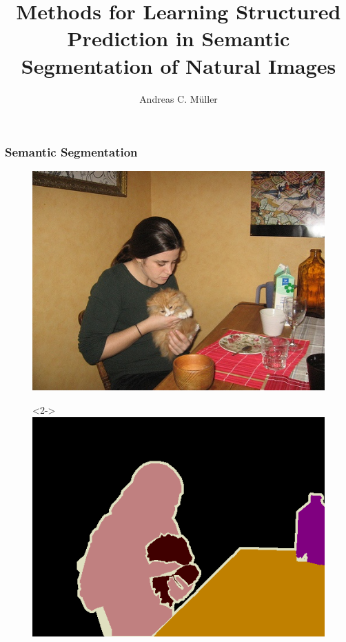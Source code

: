 \documentclass[final,ignorenonframetext,compress]{beamer}
\title[Stuctured Prediction for Semantic Segmentation] %
{Methods for Learning Structured Prediction in Semantic Segmentation of Natural Images}
\author%
{Andreas C. M\"uller}
\institute[] %
{%
    Columbia University
}
\begin{document}
\begin{frame}
    \titlepage
\end{frame}

\begin{frame}
    \tableofcontents
\end{frame}

\begin{frame}
    \frametitle{Semantic Segmentation}
        \begin{figure}
            \includegraphics[width=.4 \textwidth]{images/pascal}
            \begin{visibleenv}<2->
                \includegraphics[width=.4 \textwidth]{images/pascal_gt}
            \end{visibleenv}
        \end{figure}
\end{frame}
\end{document}
